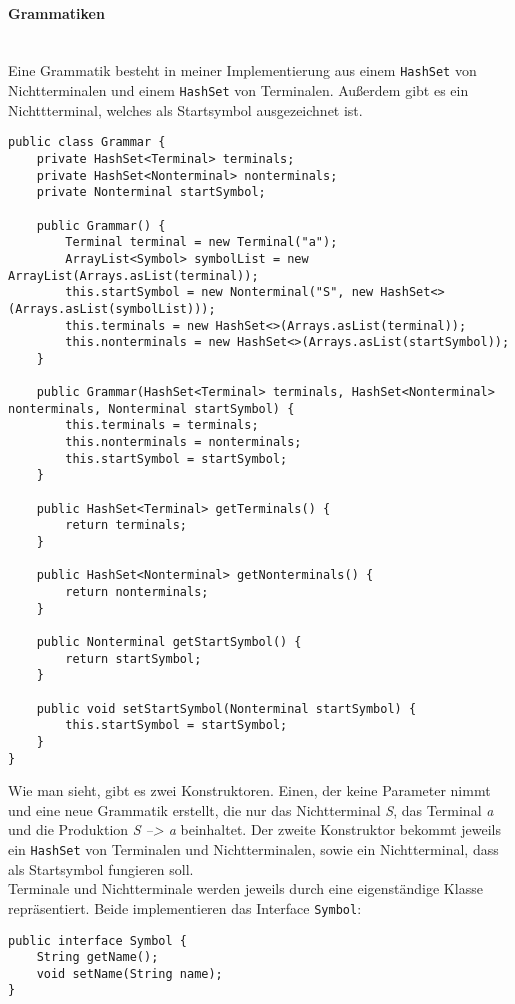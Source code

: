 \paragraph{Grammatiken}\ \\
Eine Grammatik besteht in meiner Implementierung aus einem \lstinline[columns=fixed]{HashSet} von Nichtterminalen und einem \lstinline[columns=fixed]{HashSet} von Terminalen. Außerdem gibt es ein Nichttterminal, welches als Startsymbol ausgezeichnet ist.
\begin{lstlisting}[frame=single, basicstyle=\small, caption=Die Klasse \textit{Grammar}]
public class Grammar {
	private HashSet<Terminal> terminals;
	private HashSet<Nonterminal> nonterminals;
	private Nonterminal startSymbol;
	
	public Grammar() {
		Terminal terminal = new Terminal("a");
		ArrayList<Symbol> symbolList = new ArrayList(Arrays.asList(terminal));
		this.startSymbol = new Nonterminal("S", new HashSet<>(Arrays.asList(symbolList)));
		this.terminals = new HashSet<>(Arrays.asList(terminal));
		this.nonterminals = new HashSet<>(Arrays.asList(startSymbol));
	}
	
	public Grammar(HashSet<Terminal> terminals, HashSet<Nonterminal> nonterminals, Nonterminal startSymbol) {
		this.terminals = terminals;
		this.nonterminals = nonterminals;
		this.startSymbol = startSymbol;
	}
	
	public HashSet<Terminal> getTerminals() {
		return terminals;
	}
	
	public HashSet<Nonterminal> getNonterminals() {
		return nonterminals;
	}
	
	public Nonterminal getStartSymbol() {
		return startSymbol;
	}
	
	public void setStartSymbol(Nonterminal startSymbol) {
		this.startSymbol = startSymbol;
	}
}
\end{lstlisting}
Wie man sieht, gibt es zwei Konstruktoren. Einen, der keine Parameter nimmt und eine neue Grammatik erstellt, die nur das Nichtterminal \textit{S}, das Terminal \textit{a} und die Produktion \textit{S --> a} beinhaltet. Der zweite Konstruktor bekommt jeweils ein \lstinline[columns=fixed]{HashSet} von Terminalen und Nichtterminalen, sowie ein Nichtterminal, dass als Startsymbol fungieren soll.\\
Terminale und Nichtterminale werden jeweils durch eine eigenständige Klasse repräsentiert. Beide implementieren das Interface \lstinline[columns=fixed]{Symbol}:
\begin{lstlisting}[frame=single, basicstyle=\small, caption=Das Interface \textit{Symbol}]
public interface Symbol {
	String getName();
	void setName(String name);
}
\end{lstlisting}
